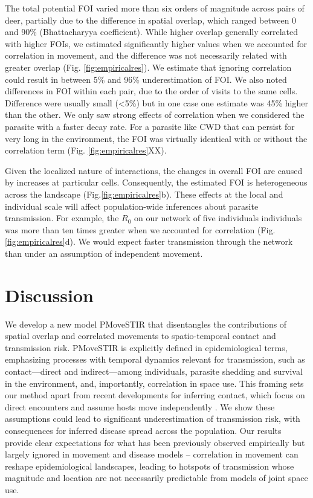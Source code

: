 \documentclass[letterpaper]{article}
\begin{document}
The total potential FOI varied more than six orders of magnitude across pairs of deer, partially due to the difference in spatial overlap, which ranged between 0 and 90\% (Bhattacharyya coefficient). While higher overlap generally correlated with higher FOIs, we estimated significantly higher values when we accounted for correlation in movement, and the difference was not necessarily related with greater overlap (Fig. \ref{fig:empiricalres}). %
We estimate that ignoring correlation could result in between 5\% and 96\% underestimation of FOI. 
We also noted differences in FOI within each pair, due to the order of visits to the same cells. Difference were usually small (<5\%) but in one case one estimate was 45\% higher than the other.
We only saw strong effects of correlation when we considered the parasite with a faster decay rate. For a parasite like CWD that can persist for very long in the environment, the FOI was virtually identical with or without the correlation term (Fig. \ref{fig:empiricalres}XX). 

Given the localized nature of interactions, the changes in overall FOI are caused by increases at particular cells. Consequently, the estimated FOI is heterogeneous across the landscape (Fig.\ref{fig:empiricalres}b). These effects at the local and individual scale will affect population-wide inferences about parasite transmission. For example, the $R_0$ on our network of five individuals individuals was more than ten times greater when we accounted for correlation (Fig. \ref{fig:empiricalres}d). We would expect faster transmission through the network than under an assumption of independent movement.

\section*{Discussion}

We develop a new model PMoveSTIR that disentangles the contributions of spatial overlap and correlated movements to spatio-temporal contact and transmission risk.  PMoveSTIR is explicitly defined in epidemiological terms, emphasizing processes with temporal dynamics relevant for transmission, such as contact---direct and indirect---among individuals, parasite shedding and survival in the environment, and, importantly, correlation in space use. 
This framing sets our method apart from recent developments for inferring contact, which focus on direct encounters and assume hosts move independently \citep{Noonan2021,Das2023}.  We show these assumptions could lead to significant underestimation of transmission risk, with consequences for inferred disease spread across the population. Our results provide clear expectations for what has been previously observed empirically but largely ignored in movement and disease models -- correlation in movement can reshape epidemiological landscapes, leading to hotspots of transmission whose magnitude and location are not necessarily predictable from models of joint space use.
\end{document}
